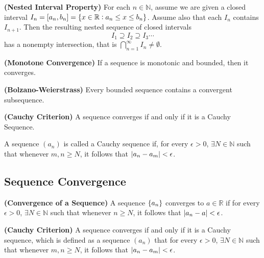 \begin{theorem}
  \textbf{\textup{(Nested Interval Property)}}
  For each $n\in \mathbb{N}$, assume we are given a closed interval $I_n = \left[a_n, b_n\right] = \{x \in \mathbb{R}:a_n \leq x \leq b_n\}$.
  Assume also that each $I_n$ contains $I_{n+1}$. Then the resulting nested sequence of closed intervals
  \begin{equation*}
    I_1 \supseteq I_2 \supseteq I_3 \cdots
  \end{equation*}
  has a nonempty intersection, that is $\bigcap_{n=1}^\infty I_n \neq \emptyset$.
\end{theorem}

\begin{theorem}
  \textbf{\textup{(Monotone Convergence)}}
  If a sequence is monotonic and bounded, then it converges.
\end{theorem}

\begin{theorem}
  \textbf{\textup{(Bolzano-Weierstrass)}}
  Every bounded sequence contains a convergent subsequence.
\end{theorem}

\begin{theorem}
  \textbf{\textup{(Cauchy Criterion)}}
  A sequence converges if and only if it is a Cauchy Sequence.
  
  A sequence $(a_n)$ is called a Cauchy sequence if, for every $\epsilon > 0$,
  $\exists N \in \mathbb{N}$ such that whenever $m, n \geq N$, it follows that $\abs{a_n - a_m} < \epsilon$.
\end{theorem}

\subsection{Sequence Convergence}
\begin{theorem}
  \textbf{\textup{(Convergence of a Sequence)}}
  A sequence $\left\{a_n\right\}$ converges to $a \in \mathbb{R}$
  if for every $\epsilon > 0$, $\exists N \in \mathbb{N}$ such that 
  whenever $n \geq N$, it follows that $\abs{a_n - a} < \epsilon$.
\end{theorem}

\begin{theorem}
  \textbf{\textup{(Cauchy Criterion)}}
  A sequence converges if and only if it is a Cauchy sequence,
  which is defined as a sequence $(a_n)$ that for every $\epsilon > 0$,
  $\exists N \in \mathbb{N}$ such that whenever $m, n \geq N$,
  it follows that $\abs{a_n - a_m} < \epsilon$.
\end{theorem}

